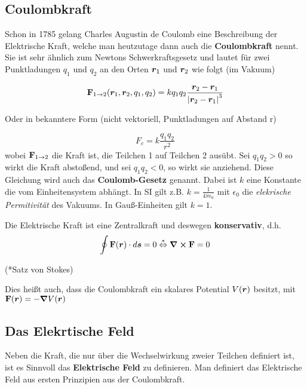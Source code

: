 \subsection{Coulombkraft}%
\label{ssub:Coulombkraft}
Schon in 1785 gelang Charles Augustin de Coulomb eine Beschreibung der
Elektrische Kraft, welche man heutzutage dann auch die 
\textbf{Coulombkraft} 
nennt. Sie ist sehr ähnlich zum Newtons Schwerkraftsgesetz und lautet für 
zwei Punktladungen $q_1$ und $q_2$ an den Orten $\vb*r_1$ und $\vb*r_2$ wie 
folgt (im Vakuum)

\begin{equation}
  \vb F_{1\to2}(\vb*r_1, \vb*r_2, q_1, q_2)= k q_1 q_2 \frac{\vb*r_2-\vb*r_1}{\abs{\vb*r_2-\vb*r_1}^3} 
\end{equation}

\noindent
\begin{center}
Oder in bekanntere Form (nicht vektoriell, Punktladungen auf Abstand r)
\end{center}
\begin{equation*}
  F_c = k \frac{q_1 q_2}{r^2} 
\end{equation*}
wobei $\vb F_{1\to2}$ die Kraft ist, die Teilchen 1 auf Teilchen 2 ausübt. 
Sei $q_1q_2>0$ so wirkt die Kraft abstoßend, 
und sei $q_1q_2<0$, so wirkt sie anziehend. Diese Gleichung wird auch das
\textbf{Coulomb-Gesetz} genannt. 
Dabei ist $k$ eine Konstante die vom Einheitensystem abhängt. In SI gilt z.B. 
$k=\frac{1}{4\pi\epsilon_0}$ mit $\epsilon_0$ die \textit{elekrische Permitivität} des Vakuums. In Gauß-Einheiten gilt $k=1$.

Die Elektrische Kraft ist eine Zentralkraft und deswegen 
\textbf{konservativ}, d.h. 
\begin{equation}
  \oint \vb F(\vb* r) \cdot d\vb*s = 0 \stackrel{*}{\Leftrightarrow} \curl \vb F =0
\end{equation}
\begin{center}
(*Satz von Stokes)
\end{center}
Dies heißt auch, dass die Coulombkraft ein skalares Potential $V(\vb*r)$ besitzt, mit
$\vb F(\vb*r)=-\grad V(\vb*r)$

\subsection{Das Elekrtische Feld}%
\label{ssub:E-feld}
Neben die Kraft, die nur über die Wechselwirkung zweier Teilchen definiert
ist, ist es Sinnvoll das \textbf{Elektrische Feld} zu definieren. Man 
definiert das Elektrische Feld aus ersten Prinzipien aus der Coulombkraft.

